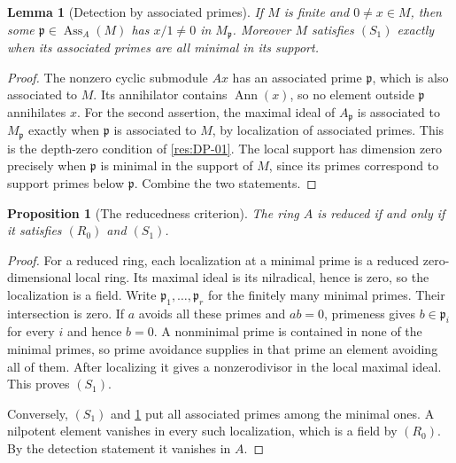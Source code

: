 \documentclass[11pt,oneside,openany]{book}
\newtheorem{lemma}[theorem]{Lemma}
\newtheorem{proposition}[theorem]{Proposition}
\theoremstyle{definition}
\theoremstyle{remark}
\begin{document}
\begin{lemma}[Detection by associated primes]\label{res:SN-02}
If $M$ is finite and $0\ne x\in M$, then some
$\mathfrak p\in\operatorname{Ass}_A(M)$ has $x/1\ne0$ in
$M_{\mathfrak p}$. Moreover $M$ satisfies $(S_1)$ exactly when
its associated primes are all minimal in its support.
\end{lemma}
\begin{proof}
The nonzero cyclic submodule $Ax$ has an associated prime
$\mathfrak p$, which is also associated to $M$. Its annihilator
contains $\operatorname{Ann}(x)$, so no element outside
$\mathfrak p$ annihilates $x$. For the second assertion, the
maximal ideal of $A_{\mathfrak p}$ is associated to
$M_{\mathfrak p}$ exactly when $\mathfrak p$ is associated
to $M$, by localization of associated primes. This is the
depth-zero condition of \ref{res:DP-01}. The local support has
dimension zero precisely when $\mathfrak p$ is minimal in
the support of $M$, since its primes correspond to support
primes below $\mathfrak p$. Combine the two statements.
\end{proof}

\begin{proposition}[The reducedness criterion]\label{res:SN-03}
The ring $A$ is reduced if and only if it satisfies $(R_0)$
and $(S_1)$.
\end{proposition}
\begin{proof}
For a reduced ring, each localization at a minimal prime is
a reduced zero-dimensional local ring. Its maximal ideal is
its nilradical, hence is zero, so the localization is a field.
Write $\mathfrak p_1,\ldots,\mathfrak p_r$ for the finitely many
minimal primes. Their intersection is zero. If $a$ avoids all
these primes and $ab=0$, primeness gives $b\in\mathfrak p_i$
for every $i$ and hence $b=0$. A nonminimal prime is contained
in none of the minimal primes, so prime avoidance supplies
in that prime an element avoiding all of them. After localizing
it gives a nonzerodivisor in the local maximal ideal. This
proves $(S_1)$.

Conversely, $(S_1)$ and \ref{res:SN-02} put all associated
primes among the minimal ones. A nilpotent element vanishes in
every such localization, which is a field by $(R_0)$. By the
detection statement it vanishes in $A$.
\end{proof}
\end{document}
